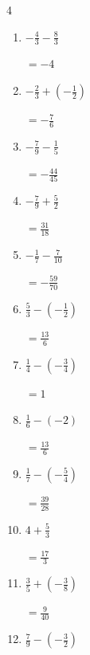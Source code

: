 \begin{multicols}{4}
\begin{enumerate}
  \item $\displaystyle -\frac{4}{3} - \frac{8}{3}$

        $\displaystyle =-4$

\columnbreak %

  \item $\displaystyle -\frac{2}{3} + \left(-\frac{1}{2}\right)$

        $\displaystyle =-\frac{7}{6}$

  \item $\displaystyle -\frac{7}{9} - \frac{1}{5}$

        $\displaystyle =-\frac{44}{45}$

  \item $\displaystyle -\frac{7}{9} + \frac{5}{2}$

        $\displaystyle =\frac{31}{18}$

  \item $\displaystyle -\frac{1}{7} - \frac{7}{10}$

        $\displaystyle =-\frac{59}{70}$

  \item $\displaystyle \frac{5}{3} - \left(-\frac{1}{2}\right)$

        $\displaystyle =\frac{13}{6}$

  \item $\displaystyle \frac{1}{4} - \left(-\frac{3}{4}\right)$

        $\displaystyle =1$

  \item $\displaystyle \frac{1}{6} - \left(-2\right)$

        $\displaystyle =\frac{13}{6}$

  \item $\displaystyle \frac{1}{7} - \left(-\frac{5}{4}\right)$

        $\displaystyle =\frac{39}{28}$

  \item $\displaystyle 4 + \frac{5}{3}$

        $\displaystyle =\frac{17}{3}$

  \item $\displaystyle \frac{3}{5} + \left(-\frac{3}{8}\right)$

        $\displaystyle =\frac{9}{40}$

\columnbreak %

  \item $\displaystyle \frac{7}{9} - \left(-\frac{3}{2}\right)$


\end{enumerate}
\end{multicols}
